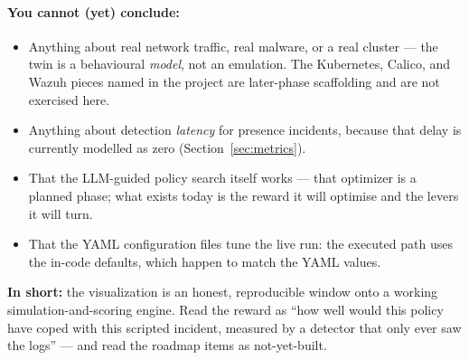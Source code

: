 \documentclass[11pt]{article}
\begin{document}
\paragraph{You cannot (yet) conclude:}
\begin{itemize}[leftmargin=1.4em,nosep]
  \item Anything about real network traffic, real malware, or a real cluster ---
        the twin is a behavioural \emph{model}, not an emulation. The Kubernetes,
        Calico, and Wazuh pieces named in the project are later-phase scaffolding
        and are not exercised here.
  \item Anything about detection \emph{latency} for presence incidents, because
        that delay is currently modelled as zero (Section~\ref{sec:metrics}).
  \item That the LLM-guided policy search itself works --- that optimizer is a
        planned phase; what exists today is the reward it will optimise and the
        levers it will turn.
  \item That the YAML configuration files tune the live run: the executed path
        uses the in-code defaults, which happen to match the YAML values.
\end{itemize}

\vspace{6pt}
\noindent\textbf{In short:} the visualization is an honest, reproducible window
onto a working simulation-and-scoring engine. Read the reward as ``how well would
this policy have coped with this scripted incident, measured by a detector that
only ever saw the logs'' --- and read the roadmap items as not-yet-built.
\end{document}
